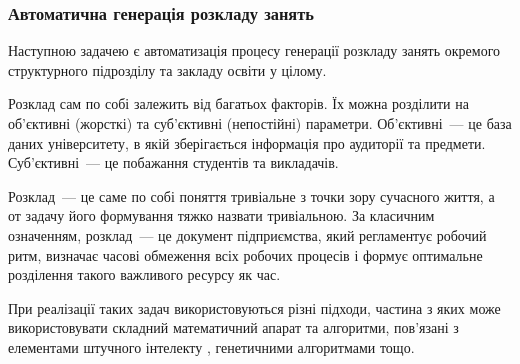 \subsubsection{Автоматична генерація розкладу занять}

Наступною задачею є автоматизація процесу  генерації розкладу занять окремого структурного підрозділу та закладу освіти у цілому. 

Розклад сам по собі залежить від багатьох факторів. Їх можна розділити на об'єктивні (жорсткі) та суб'єктивні (непостійні) параметри. Об'єктивні~--- це база даних університету, в якій зберігається інформація про аудиторії та предмети. Суб'єктивні~--- це побажання студентів та викладачів.

Розклад~--- це саме по собі поняття тривіальне з точки зору сучасного життя, а от задачу його формування тяжко назвати тривіальною. За класичним означенням, розклад~--- це документ підприємства, який регламентує робочий ритм, визначає часові обмеження всіх робочих процесів і формує оптимальне розділення такого важливого ресурсу як час.

При реалізації таких задач використовуються різні підходи, частина з яких може використовувати складний математичний апарат та алгоритми, пов'язані з елементами штучного інтелекту \cite{рубан2013аналіз}, генетичними алгоритмами \cite{мулява2016система} тощо.
